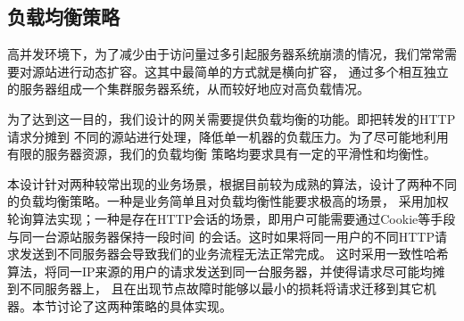 \documentclass[twoside]{CUGThesis}
\begin{document}
	\subsection{负载均衡策略}
	高并发环境下，为了减少由于访问量过多引起服务器系统崩溃的情况，我们常常需要对源站进行动态扩容。这其中最简单的方式就是横向扩容，
	通过多个相互独立的服务器组成一个集群服务器系统，从而较好地应对高负载情况。\par 
	为了达到这一目的，我们设计的网关需要提供负载均衡的功能。即把转发的HTTP请求分摊到
	不同的源站进行处理，降低单一机器的负载压力\cite{夏斌2014云服务平台负载均衡器的网络设计与实践}。为了尽可能地利用有限的服务器资源，我们的负载均衡
	策略均要求具有一定的平滑性和均衡性。\par
	本设计针对两种较常出现的业务场景，根据目前较为成熟的算法，设计了两种不同的负载均衡策略。一种是业务简单且对负载均衡性能要求极高的场景，
	采用加权轮询算法实现；一种是存在HTTP会话的场景，即用户可能需要通过Cookie等手段与同一台源站服务器保持一段时间
	的会话。这时如果将同一用户的不同HTTP请求发送到不同服务器会导致我们的业务流程无法正常完成。
	这时采用一致性哈希算法，将同一IP来源的用户的请求发送到同一台服务器，并使得请求尽可能均摊到不同服务器上，
	且在出现节点故障时能够以最小的损耗将请求迁移到其它机器。本节讨论了这两种策略的具体实现。\par 
	
\end{document}
